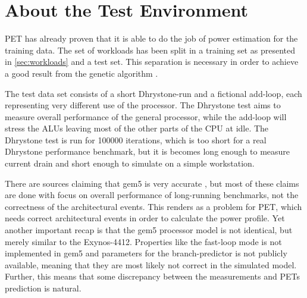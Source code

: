 \section{About the Test Environment}

PET has already proven that it is able to do the job of power estimation for the
training data. The set of workloads has been split in a training set as
presented in \autoref{sec:workloads} and a test set. This separation is
necessary in order to achieve a good result from the genetic algorithm
\cite{russellnorvig,rajer2003separation}.

The test data set consists of a short Dhrystone-run and a fictional add-loop,
each representing very different use of the processor. The Dhrystone test aims
to measure overall performance of the general processor, while the add-loop will
stress the ALUs leaving most of the other parts of the CPU at idle. The
Dhrystone test is run for 100000 iterations, which is too short for a real
Dhrystone performance benchmark, but it is becomes long enough to measure
current drain and short enough to simulate on a simple workstation.

There are sources claiming that gem5 is very accurate 
\cite{butko2012accuracy,pusdesrissources}, but most of these claims are done
with focus on overall performance of long-running benchmarks, not the correctness
of the architectural events. This renders as a problem for PET, which needs
correct architectural events in order to calculate the power profile. Yet
another important recap is that the gem5 processor model is not identical, but
merely similar to the Exynos-4412. Properties like the fast-loop mode is not implemented
in gem5 and parameters for the branch-predictor is not publicly available,
meaning that they are most likely not correct in the simulated model. Further,
this means that some discrepancy between the measurements and PETs prediction is
natural.
